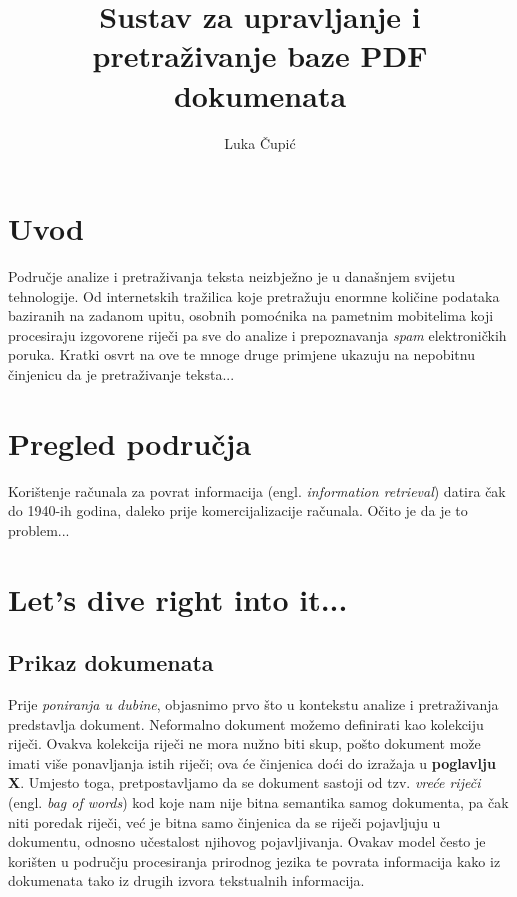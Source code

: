 \documentclass[times, utf8, zavrsni]{fer}
\begin{document}

\title{Sustav za upravljanje i pretraživanje baze PDF dokumenata}

\author{Luka Čupić}

\maketitle

\izvornik

\zahvala{}

\tableofcontents

\chapter{Uvod}
Područje analize i pretraživanja teksta neizbježno je u današnjem svijetu tehnologije. Od internetskih tražilica koje pretražuju enormne količine podataka baziranih na zadanom upitu, osobnih pomoćnika na pametnim mobitelima koji procesiraju izgovorene riječi pa sve do analize i prepoznavanja \textit{spam} elektroničkih poruka.
Kratki osvrt na ove te mnoge druge primjene ukazuju na nepobitnu činjenicu da je pretraživanje teksta...

\chapter{Pregled područja}
Korištenje računala za povrat informacija (engl. \textit{information retrieval}) datira čak do 1940-ih godina, daleko prije komercijalizacije računala. Očito je da je to problem...


\chapter{Let's dive right into it...}

\section{Prikaz dokumenata}
Prije \textit{poniranja u dubine}, objasnimo prvo što u kontekstu analize i pretraživanja predstavlja dokument. Neformalno dokument možemo definirati kao kolekciju riječi. Ovakva kolekcija riječi ne mora nužno biti skup, pošto dokument može imati više ponavljanja istih riječi; ova će činjenica doći do izražaja u \textbf{poglavlju X}. Umjesto toga, pretpostavljamo da se dokument sastoji od  tzv. \textit{vreće riječi} (engl. \textit{bag of words}) kod koje nam nije bitna semantika samog dokumenta, pa čak niti poredak riječi, već je bitna samo činjenica da se riječi pojavljuju u dokumentu, odnosno učestalost njihovog pojavljivanja.
Ovakav model često je korišten u području procesiranja prirodnog jezika te povrata informacija kako iz dokumenata tako iz drugih izvora tekstualnih informacija.
\end{document}
